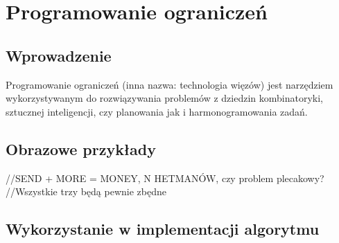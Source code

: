 \chapter{Programowanie ograniczeń}
\thispagestyle{chapterBeginStyle}

\section{Wprowadzenie}
    Programowanie ograniczeń (inna nazwa: technologia więzów) jest narzędziem wykorzystywanym do rozwiązywania 
    problemów z dziedzin kombinatoryki, sztucznej inteligencji, czy planowania jak i harmonogramowania zadań.  

\section{Obrazowe przykłady}

//SEND + MORE = MONEY, N HETMANÓW, czy problem plecakowy?
//Wszystkie trzy będą pewnie zbędne

\section{Wykorzystanie w implementacji algorytmu}
